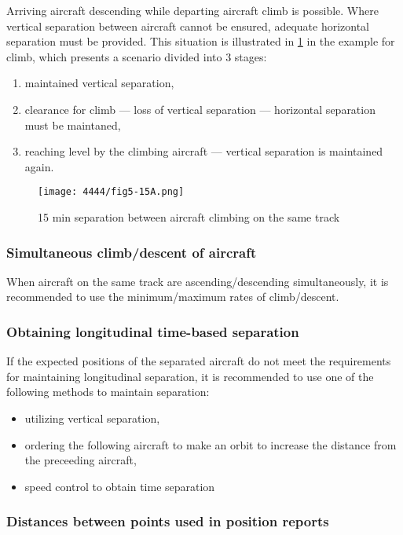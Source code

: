 Arriving aircraft descending while departing aircraft climb is possible. Where
vertical separation between aircraft cannot be ensured, adequate horizontal
separation must be provided. This situation is illustrated in \cref{fig:separation:climb15min}
in the example for climb, which presents a scenario divided into 3 stages:

\begin{enumerate}
\item maintained vertical separation,
\item clearance for climb --- loss of vertical separation --- horizontal
  separation must be maintaned,
\item reaching level by the climbing aircraft --- vertical separation is
  maintained again.
\end{enumerate}

\begin{figure}[htbp]
  \centering
  \texttt{[image: 4444/fig5-15A.png]}
  \caption{15 min separation between aircraft climbing on the same
    track~\cite{4444}}
  \label{fig:separation:climb15min}
\end{figure}

\subsubsection{Simultaneous climb/descent of aircraft}

When aircraft on the same track are ascending/descending simultaneously, it is
recommended to use the minimum/maximum rates of climb/descent.

\subsubsection{Obtaining longitudinal time-based separation}

If the expected positions of the separated aircraft do not meet the requirements
for maintaining longitudinal separation, it is recommended to use one of the
following methods to maintain separation:
\begin{itemize}
\item utilizing vertical separation,
\item ordering the following aircraft to make an orbit to increase the distance
  from the preceeding aircraft,
\item speed control to obtain time separation
\end{itemize}

\subsubsection{Distances between points used in position reports}

